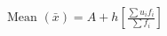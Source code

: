 \documentclass[preview]{standalone}
\begin{document}
\begin{align*}
\text{Mean } (\bar{x}) = A + h \left[ \frac{\sum u_i f_i}{\sum f_i} \right]
\end{align*}
\end{document}
